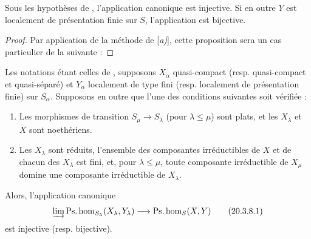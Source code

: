 \begin{proposition}[20.3.7]
\label{IV.20.3.7}
Sous les hypothèses de , l'application canonique  est injective.
Si en outre $Y$ est localement de présentation finie sur $S$, l'application  est bijective.
\end{proposition}

\begin{proof}
Par application de la méthode de [\emph{a)}], cette proposition sera un cas particulier de la suivante :
\end{proof}

\begin{proposition}[20.3.8]
Les notations étant celles de , supposons $X_\alpha$ quasi-compact \textup{(resp.} quasi-compact et quasi-séparé) et $Y_\alpha$ localement de type fini \textup{(resp.} localement de présentation finie) sur $S_\alpha$.
Supposons en outre que l'une des conditions suivantes soit vérifiée :
\begin{enumerate}[label=\emph{(\roman*)}]
  \item Les morphismes de transition $S_\mu\to S_\lambda$ (pour $\lambda\leq\mu$) sont plats, et les $X_\lambda$ et $X$ sont noethériens.
  \item Les $X_\lambda$ sont réduits, l'ensemble des composantes irréductibles de $X$ et de chacun des $X_\lambda$ est fini, et, pour $\lambda\leq\mu$, toute composante irréductible de $X_\mu$ domine une composante irréductible de $X_\lambda$.
\end{enumerate}

Alors, l'application canonique
\[
\label{IV.20.3.8.1}
  \varinjlim\operatorname{Ps.hom}_{S_\lambda}(X_\lambda,Y_\lambda)\to\operatorname{Ps.hom}_S(X,Y)
  \tag{20.3.8.1}
\]
est injective \textup{(resp.} bijective).
\end{proposition}

